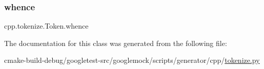 \subsubsection{\texorpdfstring{whence}{whence}}
{\footnotesize\ttfamily cpp.\+tokenize.\+Token.\+whence}



The documentation for this class was generated from the following file\+:\begin{DoxyCompactItemize}
\item 
cmake-\/build-\/debug/googletest-\/src/googlemock/scripts/generator/cpp/\mbox{\hyperlink{tokenize_8py}{tokenize.\+py}}\end{DoxyCompactItemize}

